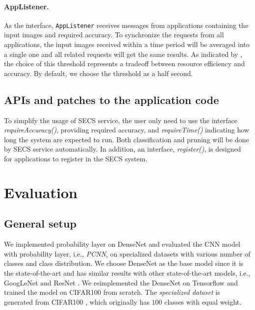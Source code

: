 \documentclass[pageno]{jpaper}
\begin{document}
\paragraph{AppListener.}
As the interface, \texttt{AppListener} receives messages from applications containing the input images and required accuracy. To synchronize the requests from all applications, the input images received within a time period will be averaged into a single one and all related requests will get the same results. As indicated by \cite{guo2018potluck, jiang2018mainstream}, the choice of this threshold represents a tradeoff between resource efficiency and accuracy. By default, we choose the threshold as a half second.

\subsection{APIs and patches to the application code}
To simplify the usage of SECS service, the user only need to use the interface \textit{requireAccuracy()}, providing required accuracy, and \textit{requireTime()} indicating how long the system are expected to run. Both classification and pruning will be done by SECS service automatically. In addition, an interface, \textit{register()}, is designed for applications to register in the SECS system.








\section{Evaluation} \label{evaluation}

\subsection{General setup}



We implemented probability layer on DenseNet \cite{huang2017densely} and evaluated the CNN model with probability layer, i.e., \textit{PCNN}, on specialized datasets with various number of classes and class distribution. We choose DenseNet as the base model since it is the state-of-the-art and has similar results with other state-of-the-art models, i.e., GoogLeNet \cite{szegedy2015going} and ResNet \cite{he2016deep}. We reimplemented the DenseNet on Tensorflow \cite{abadi2016tensorflow} and trained the model on CIFAR100 \cite{krizhevsky2009learning} from scratch. The \textit{specialized dataset} is generated from CIFAR100 \cite{krizhevsky2009learning}, which originally has $100$ classes with equal weight. 
\end{document}
